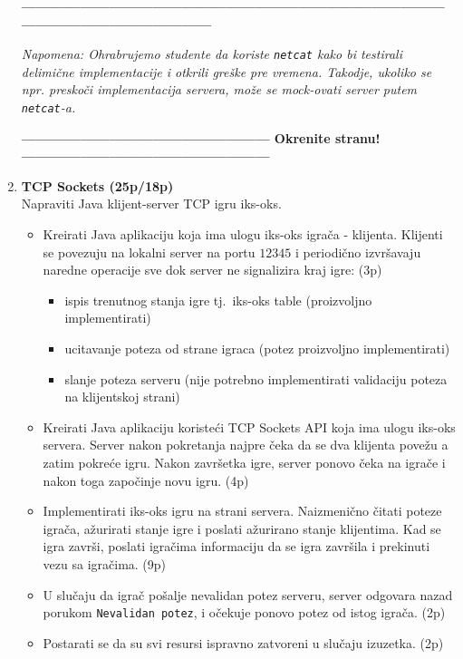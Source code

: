\documentclass[]{article}
\begin{document}
\begin{enumerate}
\begin{center}
  \textbf{------------------------------------------------------------------------------------------------------------------------------}
\end{center}
\textit{Napomena: Ohrabrujemo studente da koriste \texttt{netcat} kako bi testirali delimi\v{c}ne implementacije i otkrili gre\v{s}ke pre vremena. Takodje, ukoliko se npr. presko\v{c}i implementacija servera, mo\v{z}e se mock-ovati server putem \texttt{netcat}-a.} 
\begin{center}
  \textbf{--------------------------------------------------- Okrenite stranu! ---------------------------------------------------}
\end{center}

\newpage

\item \textbf{TCP Sockets (25p/18p)}
\\Napraviti Java klijent-server TCP igru iks-oks. 
\begin{itemize}
  \item Kreirati Java aplikaciju koja ima ulogu iks-oks igra\v{c}a - klijenta. Klijenti se povezuju na lokalni server na portu $12345$ i periodi\v{c}no izvr\v{s}avaju naredne operacije sve dok server ne signalizira kraj igre:
  \hfill (3p)
  \begin{itemize}
    \item ispis trenutnog stanja igre tj.~iks-oks table (proizvoljno implementirati)
    \item ucitavanje poteza od strane igraca (potez proizvoljno implementirati)
    \item slanje poteza serveru (nije potrebno implementirati validaciju poteza na klijentskoj strani)
  \end{itemize}
  \item Kreirati Java aplikaciju koriste\'c{}i TCP Sockets API koja ima ulogu iks-oks servera. Server nakon pokretanja najpre \v{c}eka da se dva klijenta pove\v{z}u a zatim pokre\'c{}e igru. Nakon zavr\v{s}etka igre, server ponovo \v{c}eka na igra\v{c}e i nakon toga zapo\v{c}inje novu igru. \hfill (4p)
  \item Implementirati iks-oks igru na strani servera. Naizmeni\v{c}no \v{c}itati poteze igra\v{c}a, a\v{z}urirati stanje igre i poslati a\v{z}urirano stanje klijentima. Kad se igra zavr\v{s}i, poslati igra\v{c}ima informaciju da se igra zavr\v{s}ila i prekinuti vezu sa igra\v{c}ima. \hfill (9p)
  \item U slu\v{c}aju da igra\v{c} po\v{s}alje nevalidan potez serveru, server odgovara nazad porukom \texttt{Nevalidan potez}, i o\v{c}ekuje ponovo potez od istog igra\v{c}a. \hfill (2p) 
  \item Postarati se da su svi resursi ispravno zatvoreni u slu\v{c}aju izuzetka. \hfill (2p)
\end{itemize}


\end{enumerate}
\end{document}
